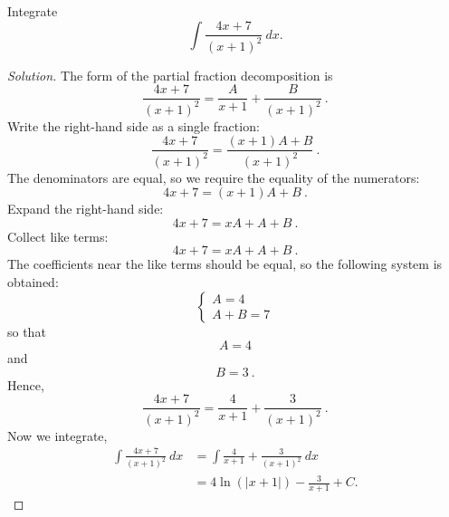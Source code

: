 \documentclass[compacto,10pt,comentarios]{aleph-notas}
\begin{document}
\begin{ejer}
    Integrate
    $$
        \int \frac{4x+7}{(x+1)^2} ~ dx.
    $$
\end{ejer}
\begin{proof}[Solution]
    The form of the partial fraction decomposition is
    $$
        \frac{4 x + 7}{\left(x + 1\right)^{2}}=\frac{A}{x + 1}+\frac{B}{\left(x + 1\right)^{2}} ~ .
    $$
    Write the right-hand side as a single fraction:
    $$
        \frac{4 x + 7}{\left(x + 1\right)^{2}}=\frac{\left(x + 1\right) A + B}{\left(x + 1\right)^{2}} ~ .
    $$
    The denominators are equal, so we require the equality of the numerators:
    $$
        4 x + 7=\left(x + 1\right) A + B ~ .
    $$
    Expand the right-hand side:
    $$
    4 x + 7=x A + A + B ~ .
    $$
    Collect like terms:
    $$
        4 x + 7=x A + A + B ~ .
    $$
    The coefficients near the like terms should be equal, so the following system is obtained:
    $$
        \begin{cases} A = 4\\A + B = 7 \end{cases} 
    $$
    so that 
    $$
        A = 4
    $$
    and
    $$
        B = 3 ~ .
    $$
    Hence,
    $$
        \frac{4 x + 7}{\left(x + 1\right)^{2}}=\frac{4}{x + 1}+\frac{3}{\left(x + 1\right)^{2}} ~ .
    $$
    Now we integrate,
    \begin{align*}
        \int \frac{4x+7}{(x+1)^2} ~ dx
        & = \int \frac{4}{x + 1}+\frac{3}{\left(x + 1\right)^{2}} ~ dx \\ 
        & = 4\ln(|x+1|) - \frac{3}{x+1} + C.
    \end{align*}
\end{proof}
\end{document}
